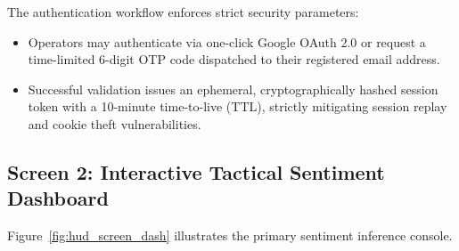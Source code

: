 The authentication workflow enforces strict security parameters:
\begin{itemize}
    \item Operators may authenticate via one-click Google OAuth 2.0 or request a time-limited 6-digit OTP code dispatched to their registered email address.
    \item Successful validation issues an ephemeral, cryptographically hashed session token with a 10-minute time-to-live (TTL), strictly mitigating session replay and cookie theft vulnerabilities.
\end{itemize}

\subsection{Screen 2: Interactive Tactical Sentiment Dashboard}
Figure~\ref{fig:hud_screen_dash} illustrates the primary sentiment inference console.

